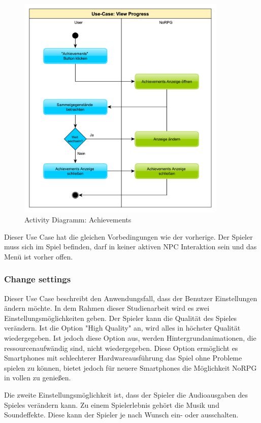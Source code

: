 			\begin{figure}[htbp]
				\centering 
				\label{umlAchievements}
				\includegraphics[width=10cm]{pics/Achievements.pdf}
				\caption{Activity Diagramm: Achievements}
			\end{figure}
			
			Dieser Use Case hat die gleichen Vorbedingungen wie der vorherige. Der Spieler muss sich im Spiel befinden, darf in keiner aktiven \ac{NPC} Interaktion sein und das Menü ist vorher offen.
		
		\subsubsection{Change settings}
			Dieser Use Case beschreibt den Anwendungsfall, dass der Benutzer Einstellungen ändern möchte. In dem Rahmen dieser Studienarbeit wird es zwei Einstellungsmöglichkeiten geben. Der Spieler kann die Qualität des Spieles verändern. Ist die Option "High Quality" an, wird alles in höchster Qualität wiedergegeben. Ist jedoch diese Option aus, werden Hintergrundanimationen, die ressourcenaufwändig sind, nicht wiedergegeben. Diese Option ermöglicht es Smartphones mit schlechterer Hardwareausführung das Spiel ohne Probleme spielen zu können, bietet jedoch für neuere Smartphones die Möglichkeit NoRPG in vollen zu genießen.
			
			Die zweite Einstellungsmöglichkeit ist, dass der Spieler die Audioausgaben des Spieles verändern kann. Zu einem Spielerlebnis gehört die Musik und Soundeffekte. Diese kann der Spieler je nach Wunsch ein- oder ausschalten.

